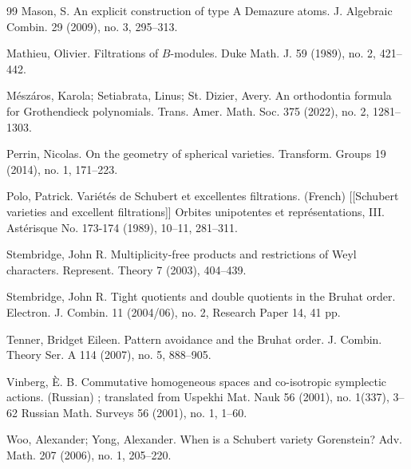 \documentclass[12pt]{amsart}
\theoremstyle{definition}
\theoremstyle{remark}
\begin{document}
\begin{thebibliography}{99}
Mason, S. An explicit construction of type A Demazure atoms. J. Algebraic Combin. 29 (2009), no. 3, 295--313.

Mathieu, Olivier. Filtrations of $B$-modules. Duke Math. J. 59 (1989), no. 2, 421--442.

Mészáros, Karola; Setiabrata, Linus; St. Dizier, Avery. An orthodontia formula for Grothendieck polynomials. Trans. Amer. Math. Soc. 375 (2022), no. 2, 1281--1303.

Perrin, Nicolas. On the geometry of spherical varieties. Transform. Groups 19 (2014), no. 1, 171--223.

Polo, Patrick. Variétés de Schubert et excellentes filtrations. (French) [[Schubert varieties and excellent filtrations]] Orbites unipotentes et représentations, III. Astérisque No. 173-174 (1989), 10--11, 281--311.

Stembridge, John R. Multiplicity-free products and restrictions of Weyl characters. Represent. Theory 7 (2003), 404--439.

Stembridge, John R. Tight quotients and double quotients in the Bruhat order. Electron. J. Combin. 11 (2004/06), no. 2, Research Paper 14, 41 pp.

Tenner, Bridget Eileen. Pattern avoidance and the Bruhat order. J. Combin. Theory Ser. A 114 (2007), no. 5, 888--905.

Vinberg, È. B. Commutative homogeneous spaces and co-isotropic symplectic actions. (Russian) ; translated from Uspekhi Mat. Nauk 56 (2001), no. 1(337), 3--62 Russian Math. Surveys 56 (2001), no. 1, 1--60.

Woo, Alexander; Yong, Alexander. When is a Schubert variety Gorenstein? Adv. Math. 207 (2006), no. 1, 205--220.

\end{thebibliography}
\end{document}
